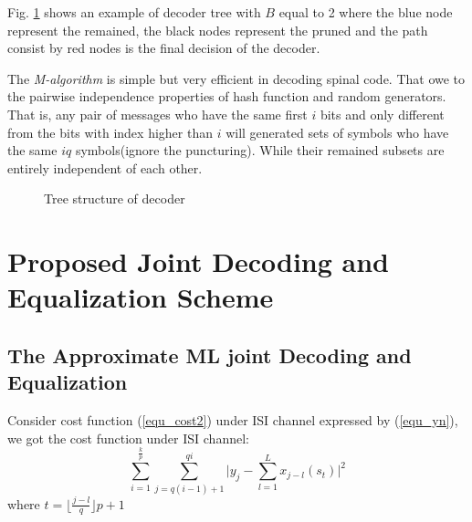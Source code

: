 \documentclass[conference]{IEEEtran}
\begin{document}
Fig. \ref{fig_decoderTree} shows an example of decoder tree with $B$ equal to 2 where the blue node represent the remained, the black nodes represent the pruned and the path consist by red nodes is the final decision of the decoder.%

The \textit{M-algorithm} is simple but very efficient in decoding spinal code. That owe to the pairwise independence properties of hash function and random generators. That is, any pair of messages who have the same first $i$ bits and only different from the bits with index higher than $i$ will generated sets of symbols who have the same $iq$ symbols(ignore the puncturing). While their remained subsets are entirely independent of each other.
\begin{figure}
\centering
{}
\caption{Tree structure of decoder}
\label{fig_decoderTree}
\end{figure}
\section{Proposed Joint Decoding and Equalization Scheme}
\subsection{The Approximate ML joint Decoding and Equalization}
Consider cost function (\ref{equ_cost2}) under ISI channel expressed by (\ref{equ_yn}), we got the cost function under ISI channel:
\begin{equation}
\sum_{i=1}^{\frac{k}{p}}\sum_{j=q(i-1)+1}^{qi}\vert y_{j}-\sum_{l=1}^L x_{j-l}(s_{t})\vert^2
\label{equ_costEqu}
\end{equation}
where $t=\lfloor\frac{j-l}{q}\rfloor p+1$
\end{document}
